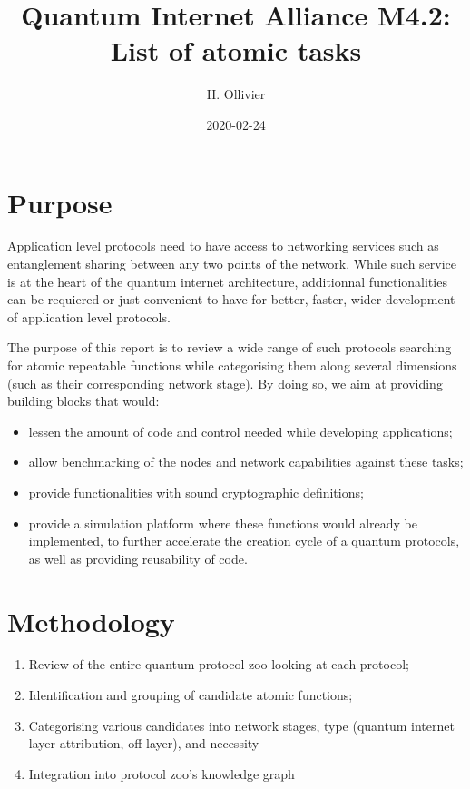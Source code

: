 \documentclass[11pt]{article}
\author{H. Ollivier}
\date{2020-02-24}
\title{Quantum Internet Alliance M4.2: List of atomic tasks}
\begin{document}
\maketitle


\section{Purpose}
\label{sec:org2c57c5f}
Application level protocols need to have access to networking services such as entanglement sharing between any two points of the network. While such service is at the heart of the quantum internet architecture, additionnal functionalities can be requiered or just convenient to have for better, faster, wider development of application level protocols. 

The purpose of this report is to review a wide range of such protocols searching for atomic repeatable functions while categorising them along several dimensions (such as their corresponding network stage). By doing so, we aim at providing building blocks that would: 
\begin{itemize}
\item lessen the amount of code and control needed while developing applications;
\item allow benchmarking of the nodes and network capabilities against these tasks;
\item provide functionalities with sound cryptographic definitions;
\item provide a simulation platform where these functions would already be implemented, to further accelerate the creation cycle of a quantum protocols, as well as providing reusability of code.
\end{itemize}

\section{Methodology}
\label{sec:org6dd60d7}
\begin{enumerate}
\item Review of the entire quantum protocol zoo looking at each protocol;
\item Identification and grouping of  candidate atomic functions;
\item Categorising various candidates into network stages, type (quantum internet layer attribution, off-layer), and necessity
\item Integration into protocol zoo's knowledge graph
\end{enumerate}
\end{document}
